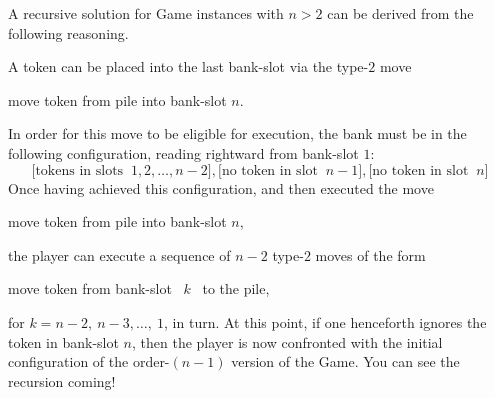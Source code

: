 
\bigskip

A recursive solution for Game instances with $n > 2$ can be derived
from the following reasoning.

A token can be placed into the last bank-slot via the type-$2$ move
\begin{center}
{\sc move token from pile into bank-slot} $n$.
\end{center}
In order for this move to be eligible for execution, the bank must be
in the following configuration, reading rightward from bank-slot $1$:
\[ \big[ \mbox{tokens in slots } \ 1, 2, \ldots, n-2 \big],
 \big[ \mbox{no token in slot } \ n-1 \big],
 \big[ \mbox{no token in slot } \ n \big]
\]
Once  having achieved this configuration, and then executed the move
\begin{center}
{\sc move token from pile into bank-slot} $n$,
\end{center}
the player can execute a sequence of $n-2$ type-$2$ moves of the form
\begin{center}
{\sc move token from bank-slot} \ $k$ \ {\sc to the pile},
\end{center}
for $k = n-2, \ n-3, \ldots, \ 1$, in turn.  At this point, if one
henceforth ignores the token in bank-slot $n$, then the player is now
confronted with the initial configuration of the order-$(n-1)$ version
of the Game.  You can see the recursion coming!

